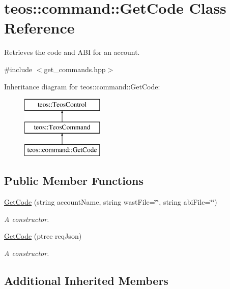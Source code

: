 \hypertarget{classteos_1_1command_1_1_get_code}{}\section{teos\+:\+:command\+:\+:Get\+Code Class Reference}
\label{classteos_1_1command_1_1_get_code}


Retrieves the code and A\+BI for an account.  




{\ttfamily \#include $<$get\+\_\+commands.\+hpp$>$}

Inheritance diagram for teos\+:\+:command\+:\+:Get\+Code\+:\begin{figure}[H]
\begin{center}
\leavevmode
\includegraphics[height=3.000000cm]{classteos_1_1command_1_1_get_code}
\end{center}
\end{figure}
\subsection*{Public Member Functions}
\begin{DoxyCompactItemize}
\item 
\mbox{\hyperlink{classteos_1_1command_1_1_get_code_ac1111aac4926fccc9447c1009aadf299}{Get\+Code}} (string account\+Name, string wast\+File=\char`\"{}\char`\"{}, string abi\+File=\char`\"{}\char`\"{})
\begin{DoxyCompactList}\small\item\em A constructor. \end{DoxyCompactList}\item 
\mbox{\hyperlink{classteos_1_1command_1_1_get_code_aa93979c1ca9b4296ccfc4ea847bd2217}{Get\+Code}} (ptree req\+Json)
\begin{DoxyCompactList}\small\item\em A constructor. \end{DoxyCompactList}\end{DoxyCompactItemize}
\subsection*{Additional Inherited Members}



